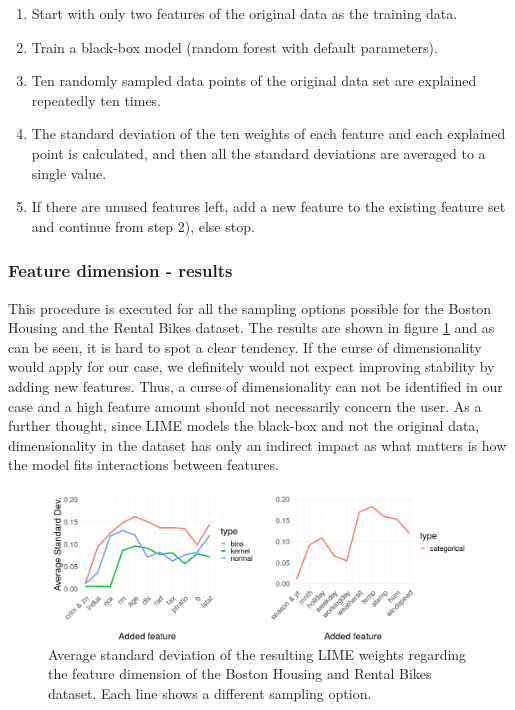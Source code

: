 \documentclass[
]{krantz}
\begin{document}
\begin{enumerate}
\def\labelenumi{\arabic{enumi})}
\item
  Start with only two features of the original data as the training data.
\item
  Train a black-box model (random forest with default parameters).
\item
  Ten randomly sampled data points of the original data set are explained repeatedly ten times.
\item
  The standard deviation of the ten weights of each feature and each explained point is calculated, and then all the standard deviations are averaged to a single value.
\item
  If there are unused features left, add a new feature to the existing feature set and continue from step 2), else stop.
\end{enumerate}

\hypertarget{feature-dimension---results}{%
\subsubsection{Feature dimension - results}\label{feature-dimension---results}}

This procedure is executed for all the sampling options possible for the Boston Housing and the Rental Bikes dataset.
The results are shown in figure \ref{fig:figsdp} and as can be seen, it is hard to spot a clear tendency.
If the curse of dimensionality would apply for our case, we definitely would not expect improving stability by adding new features.
Thus, a curse of dimensionality can not be identified in our case and a high feature amount should not necessarily concern the user.
As a further thought, since LIME models the black-box and not the original data, dimensionality in the dataset has only an indirect impact as what matters is how the model fits interactions between features.

\begin{figure}

{\centering \includegraphics[width=19.44in]{images/sd_p_presi3} 

}

\caption{Average standard deviation of the resulting LIME weights regarding the feature dimension of the Boston Housing and Rental Bikes dataset. Each line shows a different sampling option.}\label{fig:figsdp}
\end{figure}
\end{document}
